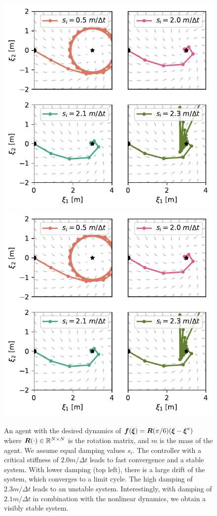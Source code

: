 
\begin{figure}[htbp]
\centering
\ifthesis
  \includegraphics[width=.7\columnwidth]{figures/discrete_controller_parameters_comparison_stable}
  \else
  \includegraphics[width=\columnwidth]{figures/discrete_controller_parameters_comparison_stable}
  \fi
\caption{An agent with the desired dynamics of
$\boldsymbol{f}(\boldsymbol{\xi}) = \boldsymbol{R}(\pi / 6) (\boldsymbol{\xi}  - \boldsymbol{\xi}^a)$ where $\boldsymbol{R}(\cdot) \in \mathbb{R}^{N \times N}$ is the rotation matrix, and $m$ is the mass of the agent. We assume equal damping values $s_i$.
The controller with a critical stiffness of $2.0 m / \Delta t$ leads to fast convergence and a stable system. With lower damping (top left), there is a large drift of the system, which converges to a limit cycle. 
The high damping of $2.3 m / \Delta t$ leads to an unstable system. 
Interestingly, with damping of $2.1 m / \Delta t$ in combination with the nonlinear dynamics, we obtain a visibly stable system.}
  \label{fig:discrete_controller_parameters_comparison_stable}
\end{figure}


